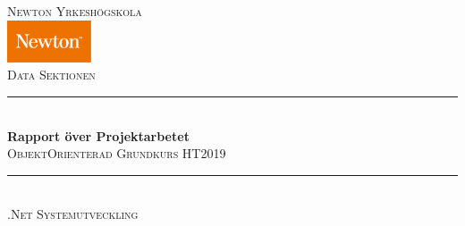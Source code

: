 \documentclass{article}
\title{\projekttitel}                                         %
\author{\forfattareett\space\forfattaretvo}                   %
\date{\projektdatum}                                          %
\theoremstyle{remark}                                         %
\def\projekttitel{Rapport över Projektarbetet}
\def\undertitel{ObjektOrienterad Grundkurs HT2019}
\begin{document}
\begin{titlepage}
	\thispagestyle{empty}
	\newcommand{\HRule}{\rule{\linewidth}{0.5mm}}
	\center
	\textsc{\Large Newton Yrkeshögskola}\\[.7cm]
	\includegraphics[width=25mm]{img/NewtonLogo.png}\\[.5cm]
	\textsc{Data Sektionen}\\[0.5cm]
	\HRule \\[0.6cm]
	{ \huge \bfseries \projekttitel}\\[0.1cm]
	\textsc{\undertitel}\\
	\HRule \\[.7cm]
	\textsc{\large .Net Systemutveckling}\\[.5cm]
	\begin{minipage}[t]{0.4\textwidth}
	\begin{flushleft}\large
    

\end{flushleft}
\end{minipage}
\end{titlepage}
\end{document}
